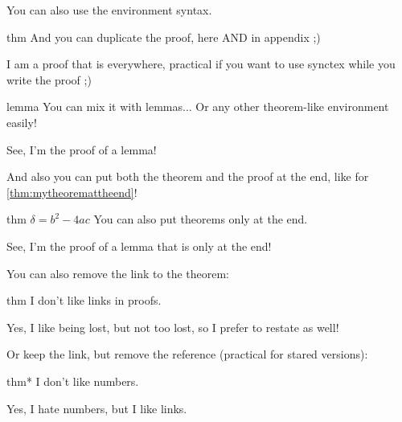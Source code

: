 \documentclass{article}
\begin{document}

\begin{textAtEnd}
  You can also use the environment syntax.
\end{textAtEnd}


\begin{theoremEnd}{thm}
  And you can duplicate the proof, here AND in appendix ;)  
\end{theoremEnd}
\begin{proofEnd}
  I am a proof that is everywhere, practical if you want to use synctex while you write the proof ;)
\end{proofEnd}

\begin{theoremEnd}{lemma}
  You can mix it with lemmas... Or any other theorem-like environment easily!  
\end{theoremEnd}
\begin{proofEnd}
  See, I'm the proof of a lemma!  
\end{proofEnd}

And also you can put both the theorem and the proof at the end, like for \autoref{thm:mytheoremattheend}!

\begin{theoremEnd}{thm}
  \label{thm:mytheoremattheend}
  $\delta = b^2-4ac$
  You can also put theorems only at the end.  
\end{theoremEnd}
\begin{proofEnd}
  See, I'm the proof of a lemma that is only at the end!
\end{proofEnd}


You can also remove the link to the theorem:
\begin{theoremEnd}{thm}
  I don't like links in proofs.  
\end{theoremEnd}
\begin{proofEnd}
  Yes, I like being lost, but not too lost, so I prefer to restate as well!
\end{proofEnd}

Or keep the link, but remove the reference (practical for stared versions):
\begin{theoremEnd}[stared]{thm*}
  I don't like numbers.
\end{theoremEnd}
\begin{proofEnd}
  Yes, I hate numbers, but I like links.
\end{proofEnd}
\end{document}
